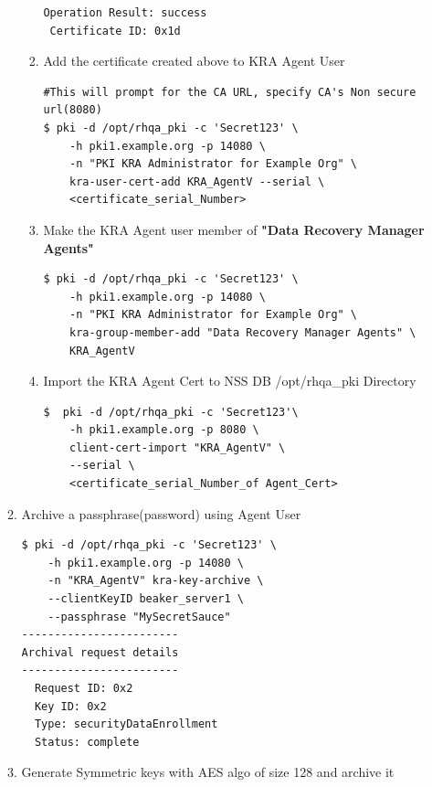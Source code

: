\documentclass[a4paper]{article}
\begin{document}
\begin{enumerate}[label*=\arabic*.]
\begin{enumerate}[label*=\arabic*.]
\begin{enumerate}[label*=\arabic*.]
\begin{lstlisting}[style=bashInputStyle]
 Operation Result: success
 Certificate ID: 0x1d
                            \end{lstlisting}
                        \item Add the certificate created above to KRA Agent User
                            \begin{lstlisting}[style=bashInputStyle]
#This will prompt for the CA URL, specify CA's Non secure url(8080)                            
$ pki -d /opt/rhqa_pki -c 'Secret123' \
    -h pki1.example.org -p 14080 \
    -n "PKI KRA Administrator for Example Org" \
    kra-user-cert-add KRA_AgentV --serial \
    <certificate_serial_Number>
                            \end{lstlisting}
                        \item Make the KRA Agent user member of \textbf{"Data Recovery Manager Agents"}
                            \begin{lstlisting}[style=bashInputStyle]
$ pki -d /opt/rhqa_pki -c 'Secret123' \
    -h pki1.example.org -p 14080 \
    -n "PKI KRA Administrator for Example Org" \
    kra-group-member-add "Data Recovery Manager Agents" \
    KRA_AgentV
                            \end{lstlisting}
                        \item Import the KRA Agent Cert to NSS DB /opt/rhqa\_pki Directory
                            \begin{lstlisting}[style=bashInputStyle]
$  pki -d /opt/rhqa_pki -c 'Secret123'\
    -h pki1.example.org -p 8080 \
    client-cert-import "KRA_AgentV" \
    --serial \
    <certificate_serial_Number_of Agent_Cert>
                            \end{lstlisting}
                    \end{enumerate}
                \item \label{arch_password}  Archive a passphrase(password) using Agent User
                    \begin{lstlisting}[style=bashInputStyle]
$ pki -d /opt/rhqa_pki -c 'Secret123' \
    -h pki1.example.org -p 14080 \
    -n "KRA_AgentV" kra-key-archive \
    --clientKeyID beaker_server1 \
    --passphrase "MySecretSauce"
------------------------
Archival request details
------------------------
  Request ID: 0x2
  Key ID: 0x2
  Type: securityDataEnrollment
  Status: complete
                    \end{lstlisting}
                \item \label{arch_symmetric} Generate Symmetric keys with AES algo of size 128 and archive it

\end{enumerate}
\end{enumerate}
\end{document}
